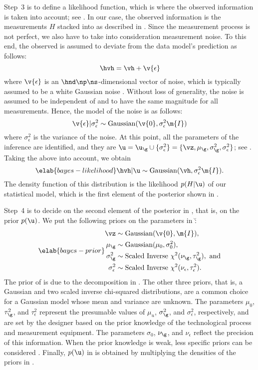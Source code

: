 Step~3 is to define a likelihood function, which is where the observed
information is taken into account; see . In our case,
the observed information is the measurements $H$ stacked into \hvh as described
in . Since the measurement process is not perfect, we
also have to take into consideration measurement noise. To this end, the
observed \hvh is assumed to deviate from the data model's prediction \vh as
follows:
\[
  \hvh = \vh + \v{\epsilon}
\]
where $\v{\epsilon}$ is an $\hnd \np \ns$-dimensional vector of noise, which is
typically assumed to be a white Gaussian noise \cite{rasmussen2006,
marzouk2009}. Without loss of generality, the noise is assumed to be independent
of \g and to have the same magnitude for all measurements. Hence, the model of
the noise is as follows:
\[
  \v{\epsilon} | \sigma^2_\epsilon \sim \mathrm{Gaussian}(\v{0}, \sigma^2_\epsilon \m{I})
\]
where $\sigma^2_\epsilon$ is the variance of the noise. At this point, all the
parameters of the inference are identified, and they are $\u = \u_\g \cup \{
\sigma_\epsilon^2 \} = \{ \vz, \mu_\g, \sigma_\g^2, \sigma_\epsilon^2 \}$; see
. Taking the above into account, we obtain
\begin{equation} \elab{bayes-likelihood}
  \hvh | \u \sim \mathrm{Gaussian}(\vh, \sigma_\epsilon^2 \m{I}).
\end{equation}
The density function of this distribution is the likelihood $p(H | \u)$ of our
statistical model, which is the first element of the posterior shown in
.

Step~4 is to decide on the second element of the posterior in
, that is, on the prior $p(\u)$. We put the following priors
on the parameters in \u:
\begin{align} \elab{bayes-prior}
  \begin{split}
    \vz               & \sim \mathrm{Gaussian}(\v{0}, \m{I}), \\
    \mu_\g            & \sim \mathrm{Gaussian}(\mu_0, \sigma^2_0), \\
    \sigma^2_\g       & \sim \mathrm{Scaled\ Inverse\ } \chi^2(\nu_\g, \tau^2_\g), \text{ and} \\
    \sigma^2_\epsilon & \sim \mathrm{Scaled\ Inverse\ } \chi^2(\nu_\epsilon, \tau^2_\epsilon).
  \end{split}
\end{align}
The prior of \vz is due to the decomposition in . The
other three priors, that is, a Gaussian and two scaled inverse chi-squared
distributions, are a common choice for a Gaussian model whose mean and variance
are unknown. The parameters $\mu_0$, $\tau^2_\g$, and $\tau^2_\epsilon$
represent the presumable values of $\mu_u$, $\sigma^2_\g$, and
$\sigma^2_\epsilon$, respectively, and are set by the designer based on the
prior knowledge of the technological process and measurement equipment. The
parameters $\sigma_0$, $\nu_\g$, and $\nu_\epsilon$ reflect the precision of
this information. When the prior knowledge is weak, less specific priors can be
considered \cite{gelman2013}. Finally, $p(\u)$ in  is
obtained by multiplying the densities of the priors in .

